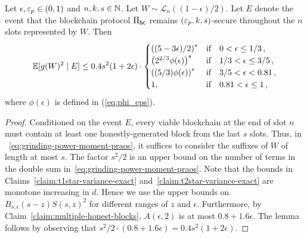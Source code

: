 \begin{lemma}\label{lemma:grinding-praos-second-moment}
  Let $\epsilon, \mathsf{\varepsilon}_p \in (0, 1)$ and $n, k, s \in \mathbb{N}$. 
  Let $W \sim \mathcal{L}_n((1 - \epsilon)/2)$. 
  Let $E$ denote the event that 
  the blockchain protocol $\Pi_\mathsf{bc}$ 
  remains $(\mathsf{\varepsilon}_p, k, s)$-secure throughout 
  the $n$ slots represented by $W$. 
  Then
  \begin{equation}\label{eq:grindign-praos-second-moment}
    \operatorname{\mathbb{E}}[ g(W)^2 \mid E] 
    \leq 
      0.4 s^2 (1 + 2\epsilon)
      \cdot \begin{cases}
      \left( (5-3 \epsilon)/2 \right)^s & \text{if}\quad 0 < \epsilon \leq 1/3\,, \\
      \left( 2^{2/3} \phi(\epsilon) \right)^s & \text{if}\quad 1/3 < \epsilon \leq 3/5\,, \\
      \left( (5/3) \phi(\epsilon) \right)^s & \text{if}\quad 3/5 < \epsilon < 0.81\,, \\
      1,  & \text{if}\quad 0.81 < \epsilon \leq 1\,,
    \end{cases}    
  \end{equation}
  where $\phi(\epsilon)$ is defined in (\ref{eq:phi_eps}).
\end{lemma}
\begin{proof}
  Conditioned on the event $E$, 
  every viable blockchain at the end of slot $n$ 
  must contain at least one honestly-generated block from the last $s$ slots. 
  Thus, 
  in ~\eqref{eq:grinding-power-moment-praos}, 
  it suffices to consider the suffixes of $W$ of length at most $s$. 
  The factor $s^2/2$ is an upper bound on 
  the number of terms in the double sum in~\eqref{eq:grinding-power-moment-praos}. 
  Note that the bounds in 
  Claims~\ref{claim:t1star-variance-exact} 
  and~\ref{claim:t2star-variance-exact} are monotone increasing in $d$. 
  Hence we use the upper bounds on $B_{s, \epsilon}(s-z) S(s,z)^2$ for 
  different ranges of $z$ and $\epsilon$. 
  Furthermore, by Claim~\ref{claim:multiple-honest-blocks}, 
  $A(\epsilon, 2)$ is at most $0.8 + 1.6 \epsilon$. 
  The lemma follows by observing that $s^2/2 \cdot (0.8 + 1.6 \epsilon) = 0.4 s^2 (1 + 2 \epsilon)$.
\end{proof}


